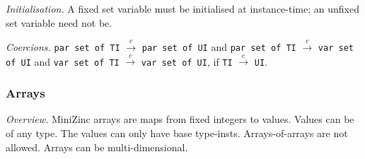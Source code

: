 \documentclass[10pt]{scrartcl}
\newcommand{\pjs}[1]{\textcolor{blue}{PJS:#1}}
\newcommand{\TyThing}[1]{\vspace{1.2mm}\noindent\emph{#1} }
\newcommand{\TyOverview}{\TyThing{Overview.}}
\newcommand{\TyInit}{\TyThing{Initialisation.}}
\newcommand{\TyCoercions}{\TyThing{Coercions.}}
\newcommand{\coerce}[2]{#1 $\stackrel{c}{\rightarrow}$ #2}
\begin{document}

\TyInit
A fixed set variable must be initialised at instance-time;  an unfixed
set variable need not be.

\TyCoercions
\coerce{\texttt{par set of TI}}{\texttt{par set of UI}} and
\coerce{\texttt{par set of TI}}{\texttt{var set of UI}} and
\coerce{\texttt{var set of TI}}{\texttt{var set of UI}}, if
\coerce{\texttt{TI}}{\texttt{UI}}.


\subsubsection{Arrays}
        \label{Arrays}
\TyOverview
MiniZinc arrays are maps from fixed integers to values.  
Values can be of any type.  
The values can only have base type-insts.  
Arrays-of-arrays are not allowed.
Arrays can be multi-dimensional.
\end{document}
